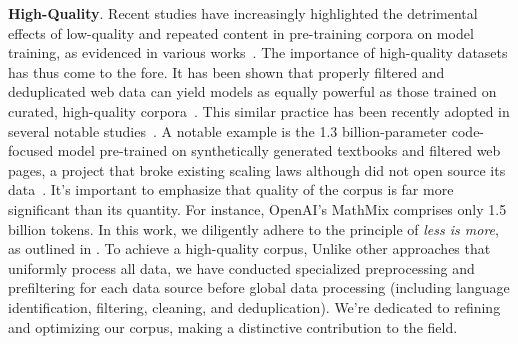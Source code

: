 \textbf{High-Quality}. Recent studies have increasingly highlighted the detrimental effects of low-quality and repeated content in pre-training corpora on model training, as evidenced in various works~\citep{10.1145/3359591.3359735-code-duplication,luccioni-viviano-2021-whats,lee-etal-2022-deduplicating,DBLP:journals/corr/abs-2205-10487-scaling-law-for-training-on-repeated-data,DBLP:journals/corr/abs-2305-13169-a-pretrainer-data-guide}. The importance of high-quality datasets has thus come to the fore. It has been shown that properly filtered and deduplicated web data can yield models as equally powerful as those trained on curated, high-quality corpora~\citep{DBLP:journals/corr/abs-2306-01116-refinedweb}. This similar practice has been recently adopted in several notable studies~\citep{SlimPajama,allenai-dolma,RedPajama-v2}. 
A notable example is the 1.3 billion-parameter code-focused model pre-trained on synthetically generated textbooks and filtered web pages, a project that broke existing scaling laws although did not open source its data~\citep{DBLP:journals/corr/abs-2306-11644-textbooks-are-all-you-need}. It's important to emphasize that quality of the corpus is far more significant than its quantity. For instance, OpenAI's MathMix comprises only 1.5 billion tokens. In this work, we diligently adhere to the principle of \emph{less is more}, as outlined in \citet{DBLP:journals/corr/abs-2305-11206-lima}. To achieve a high-quality corpus, 
Unlike other approaches that uniformly process all data, we have conducted specialized preprocessing and prefiltering for each data source before global data processing (including language identification, filtering, cleaning, and deduplication). We're dedicated to refining and optimizing our corpus, making a distinctive contribution to the field.

